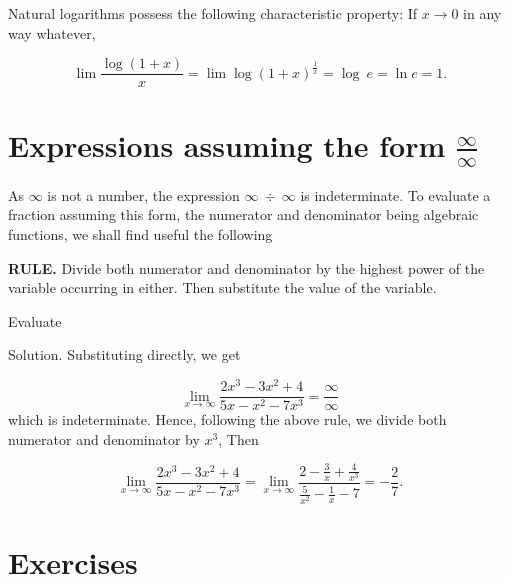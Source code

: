 Natural logarithms possess the following characteristic property: If $x \to 0$ in any way whatever,

\[
  \lim \frac{\log(1 + x)}{x} = \lim \log(1 + x)^{\frac{1}{x}} = \log\ e 
= \ln e %
= 1. 
\]

\section{Expressions assuming the form $\frac{\infty}{\infty}$} 
\label{sec:24}

As $\infty$ is not a number, the expression $\infty\ \div\ \infty$ is indeterminate. 
To evaluate a fraction assuming this form, the numerator and denominator 
being algebraic functions, we shall find useful the following

\noindent
{\bf RULE.} 
Divide both numerator and denominator by the highest power of the variable occurring in either. 
Then substitute the value of the variable.

\begin{example}
{\rm
Evaluate %

Solution. Substituting directly, we get 

\[
\lim_{x \to \infty} \frac{2x^3 - 3x^2 + 4}{5x - x^2 - 7x^3} = \frac{\infty}{\infty}
\]
which is indeterminate. Hence, following the above rule, we divide both 
numerator and denominator by $x^3$, Then

\[
 \lim_{x \to \infty} \frac{2x^3 - 3x^2 + 4}{5x - x^2 - 7x^3} 
= \lim_{x \to \infty} \frac{2 - \frac{3}{x} + \frac{4}{x^3}}{\frac{5}{x^2} - \frac{1}{x} - 7} 
= -\frac{2}{7}.
\]
}
\end{example}


\section{Exercises}

